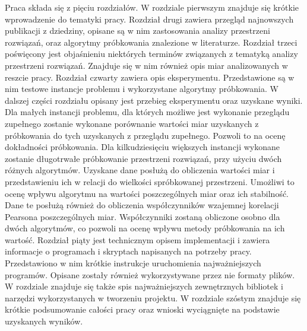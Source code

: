 Praca składa się z pięciu rozdziałów.
W rozdziale pierwszym znajduje się krótkie wprowadzenie do tematyki pracy.
Rozdział drugi zawiera przegląd najnowszych publikacji z dziedziny, opisane są w nim zastosowania analizy przestrzeni rozwiązań, oraz algorytmy
próbkowania znalezione w literaturze.
Rozdział trzeci poświęcony jest objaśnieniu niektórych terminów związanych z tematyką
analizy przestrzeni rozwiązań. Znajduje się w nim również opis miar analizowanych w reszcie pracy.
Rozdział czwarty zawiera opis eksperymentu. Przedstawione są w nim testowe instancje problemu i wykorzystane algorytmy próbkowania.
W dalszej części rozdziału opisany jest przebieg eksperymentu oraz uzyskane wyniki.
Dla małych instancji problemu, dla których możliwe jest wykonanie przeglądu zupełnego zostanie wykonane porównanie wartości miar
uzyskanych z próbkowania do tych uzyskanych z przeglądu zupełnego. Pozwoli to na ocenę dokładności próbkowania.
Dla kilkudziesięciu większych instancji wykonane zostanie długotrwałe próbkowanie przestrzeni rozwiązań, przy użyciu dwóch różnych algorytmów.
Uzyskane dane posłużą do obliczenia wartości miar i przedstawieniu ich w relacji do wielkości spróbkowanej przestrzeni.
Umożliwi to ocenę wpływu algorytmu na wartości poszczególnych miar oraz ich stabilność.
Dane te posłużą również do obliczenia współczynników wzajemnej korelacji Pearsona poszczególnych miar.
Współczynniki zostaną obliczone osobno dla dwóch algorytmów, co pozwoli na ocenę wpływu metody próbkowania na ich wartość.
Rozdział piąty jest technicznym opisem implementacji i zawiera informacje o programach i skryptach napisanych na potrzeby pracy.
Przedstawiono w nim krótkie instrukcje uruchomienia najważniejszych programów. Opisane zostały również wykorzystywane przez nie formaty plików.
W rozdziale znajduje się także spis najważniejszych zewnętrznych bibliotek i narzędzi wykorzystanych w tworzeniu projektu.
W rozdziale szóstym znajduje się krótkie podsumowanie całości pracy oraz wnioski wyciągnięte na podstawie uzyskanych wyników.
